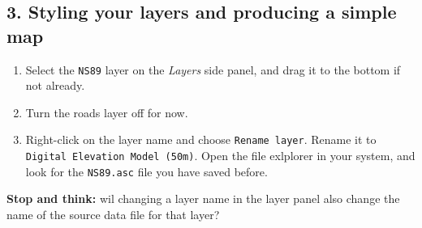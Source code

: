 \documentclass[
]{book}
\begin{document}
\hypertarget{styling-your-layers-and-producing-a-simple-map}{%
\subsection{3. Styling your layers and producing a simple map}\label{styling-your-layers-and-producing-a-simple-map}}

\begin{enumerate}
\def\labelenumi{\arabic{enumi}.}
\item
  Select the \texttt{NS89} layer on the \emph{Layers} side panel, and drag it to the bottom if not already.
\item
  Turn the roads layer off for now.
\item
  Right-click on the layer name and choose \texttt{Rename\ layer}. Rename it to \texttt{Digital\ Elevation\ Model\ (50m)}. Open the file exlplorer in your system, and look for the \texttt{NS89.asc} file you have saved before.
\end{enumerate}

\textbf{Stop and think:} wil changing a layer name in the layer panel also change the name of the source data file for that layer?
\end{document}
